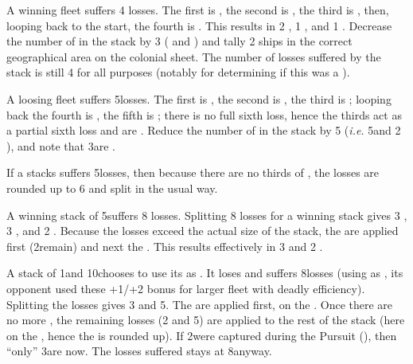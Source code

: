 \begin{exemple}
  A winning fleet suffers 4 losses. The first is , the second
  is , the third is , then, looping back to
  the start, the fourth is . This results in 2 
  \ND, 1 , and 1 . Decrease the number of \ND
  in the stack by 3 ( and ) and tally 2
   ships in the correct geographical area on the colonial
  sheet. The number of losses suffered by the stack is still 4 for all
  purposes (notably for determining if this was a ).

  \smallskip

  A loosing \NWD fleet suffers 5\texttd losses. The first is ,
  the second is , the third is ; looping back
  the fourth is , the fifth is ; there is no
  full sixth loss, hence the thirds act as a partial sixth loss and are
  . Reduce the number of \ND in the stack by 5\texttd
  (\emph{i.e.} 5\ND and 2 \NDE), and note that 3\texttd are .

  \smallskip

  If a \NGD stacks suffers 5\texttu losses, then because there are no
  thirds of \NGD, the losses are rounded up to 6 and split in the usual way.

  \smallskip

  A winning stack of 5\ND suffers 8 losses. Splitting 8 losses for a winning
  stack gives 3 , 3 , and 2
  . Because the losses exceed the actual size of the stack,
  the  are applied first (2\ND remain) and next the
  . This results effectively in 3  and 2
  .

  \smallskip

  A stack of 1\NWD and 10\NGD chooses to use its \NWD as . It loses and suffers 8\texttd losses (using \NGD as , its opponent used these +1/+2 bonus for larger fleet with
  deadly efficiency). Splitting the losses gives 3  and
  5\texttd {}. The  are applied first, on the
  . Once there are no more ,
  the remaining losses (2  and 5\texttd {}) are
  applied to the rest of the stack (here on the \NGD, hence the \texttd is
  rounded up). If 2\NGD were captured during the Pursuit (\textetoile), then
  ``only'' 3\texttd are  now. The losses suffered stays at
  8\texttd anyway.
\end{exemple}

